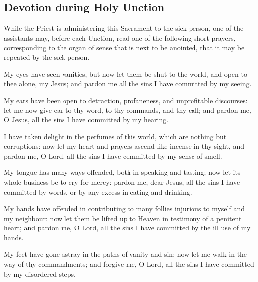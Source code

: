 \clearpage
\subsection{Devotion during Holy Unction}
\begin{rubric}
    While the Priest is administering this Sacrament to the sick person, one of the assistants may, before each Unction, read one of the following short prayers, corresponding to the organ of sense that is next to be anointed, that it may be repeated by the sick person.
\end{rubric}
My eyes have seen vanities, but now let them be shut to the world, and open to thee alone, my Jesus; and pardon me all the sins I have committed by my seeing.\par
My ears have been open to detraction, profaneness, and unprofitable discourses: let me now give ear to thy word, to thy commands, and thy call; and pardon me, O Jesus, all the sins I have committed by my hearing.\par
I have taken delight in the perfumes of this world, which are nothing but corruptions: now let my heart and prayers ascend like incense in thy sight, and pardon me, O Lord, all the sins I have committed by my sense of smell.\par
My tongue has many ways offended, both in speaking and tasting; now let its whole business be to cry for mercy: pardon me, dear Jesus, all the sins I have committed by words, or by any excess in eating and drinking.\par
My hands have offended in contributing to many follies injurious to myself and my neighbour: now let them be lifted up to Heaven in testimony of a penitent heart; and pardon me, O Lord, all the sins I have committed by the ill use of my hands.\par
My feet have gone astray in the paths of vanity and sin: now let me walk in the way of thy commandments; and forgive me, O Lord, all the sins I have committed by my disordered steps.
